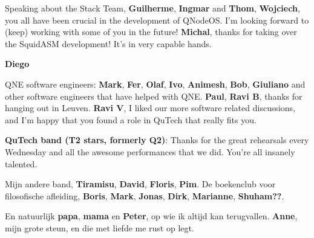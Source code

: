 Speaking about the Stack Team,
\textbf{Guilherme}, \textbf{Ingmar} and \textbf{Thom}, \textbf{Wojciech}, you all have been crucial in the development of QNodeOS.
I'm looking forward to (keep) working with some of you in the future!
\textbf{Michal}, thanks for taking over the SquidASM development! It's in very capable hands.

\textbf{Diego}

QNE software engineers:
\textbf{Mark}, \textbf{Fer}, \textbf{Olaf}, \textbf{Ivo}, \textbf{Animesh}, \textbf{Bob}, \textbf{Giuliano} and other software engineers that have helped with QNE.
\textbf{Paul}, \textbf{Ravi B}, thanks for hanging out in Leuven.
\textbf{Ravi V}, I liked our more software related discussions, and I'm happy that you found a role in QuTech that really fits you.


\textbf{QuTech band (T2 stars, formerly Q2)}: Thanks for the great rehearsals every Wednesday and all the awesome performances that we did. You're all insanely talented.


Mijn andere band, \textbf{Tiramisu}, \textbf{David}, \textbf{Floris}, \textbf{Pim}.
De boekenclub voor filosofische afleiding, \textbf{Boris}, \textbf{Mark}, \textbf{Jonas}, \textbf{Dirk}, \textbf{Marianne}, \textbf{Shuham??}.

En natuurlijk \textbf{papa}, \textbf{mama} en \textbf{Peter}, op wie ik altijd kan terugvallen.
\textbf{Anne}, mijn grote steun, en die met liefde me rust op legt.






